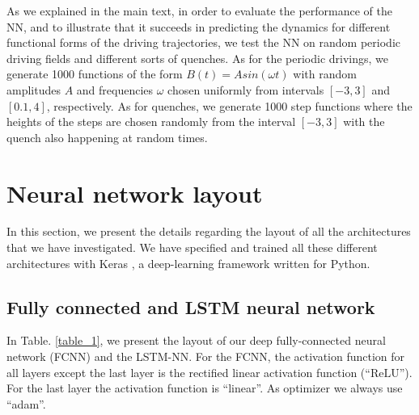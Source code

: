 \documentclass[a4paper,aps,amsmath,amssymb,twocolumn,longbibliography,,accepted=2022-05-17]{quantumarticle}
\begin{document}
As we explained in the main text, in order to evaluate the performance of the NN, and to illustrate that it succeeds in predicting the dynamics for different functional forms of the driving trajectories, we test the NN on random periodic driving fields and different sorts of quenches. As for the periodic drivings, we generate 1000 functions of the form $B(t)=A sin(\omega t) $ with random amplitudes $A$ and frequencies $\omega$ chosen uniformly from intervals $[-3,3]$ and $[0.1, 4]$, respectively. As for quenches, we generate 1000 step functions where the heights of the steps are chosen randomly from the interval $[-3,3]$ with the quench also happening at random times.

\section{Neural network layout}

In this section, we present the details regarding the layout of all the architectures that we have investigated. We have specified and trained all these different architectures with Keras \cite{chollet2015keras}, a deep-learning framework written for Python.

\subsection{Fully connected and LSTM neural network}

In Table. \ref{table_1}, we present the layout of our deep fully-connected neural network (FCNN) and the LSTM-NN. For the FCNN, the activation function for all layers except the last layer is the rectified linear activation function (``$\mathrm{ReLU}$''). For the last layer the activation function is ``linear''. As optimizer we always use ``adam''.
\end{document}
